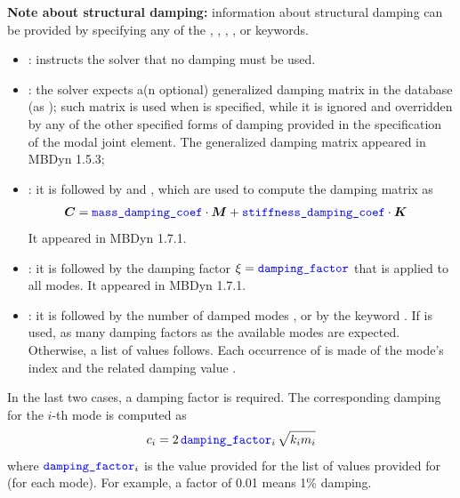 \textbf{Note about structural damping:}
information about structural damping can be provided by specifying any of the
, , ,
, or  keywords.
\begin{itemize}
\item
{}:
instructs the solver that no damping must be used.

\item
{}:
the solver expects a(n optional) generalized damping matrix in the database
(as );
such matrix is used when  is specified,
while it is ignored and overridden by any of the other specified forms
of damping provided in the specification of the modal joint element.
The generalized damping matrix appeared in MBDyn 1.5.3;

\item
{}:
it is followed by
 and ,
which are used to compute the damping matrix as
\begin{align}
	\boldsymbol{C} &= \textcolor{blue}{\texttt{mass\_damping\_coef}} \cdot \boldsymbol{M} + \textcolor{blue}{\texttt{stiffness\_damping\_coef}} \cdot \boldsymbol{K}
\end{align}
It appeared in MBDyn 1.7.1.

\item
{}:
it is followed by the damping factor $\xi = \textcolor{blue}{\texttt{damping\_factor}}$
that is applied to all modes.
It appeared in MBDyn 1.7.1.

\item
{}:
it is followed by the number of damped modes ,
or by the keyword .
If  is used, as many damping factors as the available modes
are expected.
Otherwise, a list of  values follows.
Each occurrence of  is made of the mode's index 
and the related damping value .
\end{itemize}

In the last two cases, a damping factor is required.
The corresponding damping for the $i$-th mode is computed as
\begin{displaymath}
	c_i = 2 \, \textcolor{blue}{\texttt{damping\_factor}}_i \, \sqrt{k_i m_i}
\end{displaymath}
where $\textcolor{blue}{\texttt{damping\_factor}}_i$ is the value provided for the list 
of values provided for  (for each mode).
For example, a factor of 0.01 means 1\% damping.

